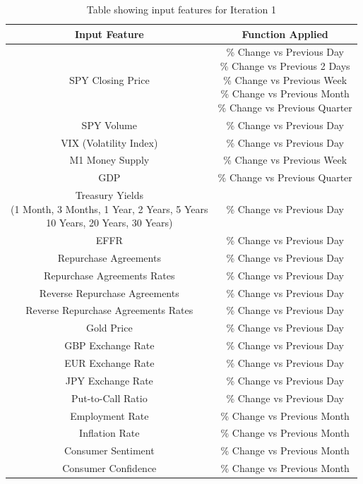 \begin{table}[ht]
    \centering
    \begin{tabular}{|c|c|}
        \hline
        Input Feature & Function Applied \\
        \hline\hline
        SPY Closing Price & \makecell{\% Change vs Previous Day \\
        \% Change vs Previous 2 Days\\
        \% Change vs Previous Week\\
        \% Change vs Previous Month\\
        \% Change vs Previous Quarter} \\
        SPY Volume & \% Change vs Previous Day \\
        VIX (Volatility Index) & \% Change vs Previous Day \\
        M1 Money Supply & \% Change vs Previous Week \\
        GDP & \% Change vs Previous Quarter \\
        \makecell{Treasury Yields\\
        (1 Month, 3 Months, 1 Year, 2 Years, 5 Years\\
        10 Years, 20 Years, 30 Years)}& \% Change vs Previous Day \\
        EFFR & \% Change vs Previous Day \\
        Repurchase Agreements & \% Change vs Previous Day \\
        Repurchase Agreements Rates & \% Change vs Previous Day \\
        Reverse Repurchase Agreements & \% Change vs Previous Day \\
        Reverse Repurchase Agreements Rates & \% Change vs Previous Day \\
        Gold Price & \% Change vs Previous Day \\
        GBP Exchange Rate & \% Change vs Previous Day \\
        EUR Exchange Rate & \% Change vs Previous Day \\
        JPY Exchange Rate & \% Change vs Previous Day \\
        Put-to-Call Ratio & \% Change vs Previous Day \\
        Employment Rate & \% Change vs Previous Month \\
        Inflation Rate & \% Change vs Previous Month \\
        Consumer Sentiment & \% Change vs Previous Month \\
        Consumer Confidence & \% Change vs Previous Month \\
        \hline
    \end{tabular}
    \caption{Table showing input features for Iteration 1}
    \label{tab:artefact_data_normalisation}
\end{table}
\FloatBarrier


